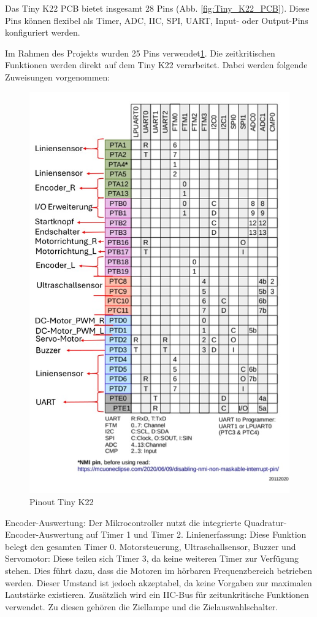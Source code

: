 Das Tiny K22 PCB bietet insgesamt 28 Pins (Abb. \ref{fig:Tiny_K22_PCB}). Diese Pins können flexibel als Timer, ADC, IIC, SPI, UART, Input- oder Output-Pins konfiguriert werden.

Im Rahmen des Projekts wurden 25 Pins verwendet\ref{fig:Tiny_K22_Pinout_definition}. Die zeitkritischen Funktionen werden direkt auf dem Tiny K22 verarbeitet. Dabei werden folgende Zuweisungen vorgenommen:

\begin{figure}[H]
    \centering
    \includegraphics[width=0.8\linewidth, angle=-90]{img/Tiny_K22_Pinout_definition.jpg}
    \caption{Pinout Tiny K22}
    \label{fig:Tiny_K22_Pinout_definition}
\end{figure}

Encoder-Auswertung: Der Mikrocontroller nutzt die integrierte Quadratur-Encoder-Auswertung auf Timer 1 und Timer 2.
Linienerfassung: Diese Funktion belegt den gesamten Timer 0.
Motorsteuerung, Ultraschallsensor, Buzzer und Servomotor: Diese teilen sich Timer 3, da keine weiteren Timer zur Verfügung stehen. Dies führt dazu, dass die Motoren im hörbaren Frequenzbereich betrieben werden. Dieser Umstand ist jedoch akzeptabel, da keine Vorgaben zur maximalen Lautstärke existieren.
Zusätzlich wird ein IIC-Bus für zeitunkritische Funktionen verwendet. Zu diesen gehören die Ziellampe und die Zielauswahlschalter.

